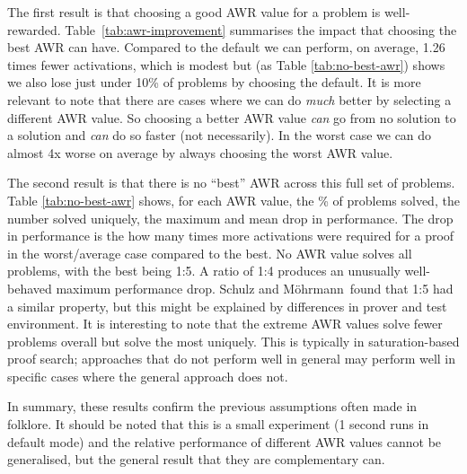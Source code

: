 \documentclass{llncs}
\newcommand{\sandm}{Schulz and M{\"{o}}hrmann}
\begin{document}
The first result is that choosing a good AWR value for a problem is well-rewarded. Table~\ref{tab:awr-improvement} summarises the impact that choosing the best AWR can have. Compared to the default we can perform, on average, 1.26 times fewer activations, which is modest but (as Table \ref{tab:no-best-awr}) shows we also lose just under 10\% of problems by choosing the default. It is more relevant to note that there are cases where we can do \emph{much} better by selecting a different AWR value. So choosing a better AWR value \emph{can} go from no solution to a solution and \emph{can} do so faster (not necessarily). In the worst case we can do almost 4x worse on average by always choosing the worst AWR value.

The second result is that there is no ``best'' AWR across this full set of problems. Table \ref{tab:no-best-awr} shows, for each AWR value, the \% of problems solved, the number solved uniquely, the maximum and mean drop in performance. The drop in performance is the how many times more activations were required for a proof in the worst/average case compared to the best. No AWR value solves all problems, with the best being 1:5. 
A ratio of 1:4 produces an unusually well-behaved maximum performance drop.
\sandm~found that 1:5 had a similar property, but this might be explained by differences in prover and test environment. It is interesting to note that the extreme AWR values solve fewer problems overall but solve the most uniquely. This is typically in saturation-based proof search; approaches that do not perform well in general may perform well in specific cases where the general approach does not.

In summary, these results confirm the previous assumptions often made in folklore. It should be noted that this is a small experiment (1 second runs in default mode) and the relative performance of different AWR values cannot be generalised, but the general result that they are complementary can.
\end{document}
